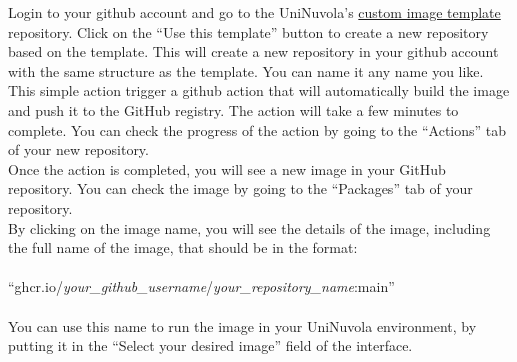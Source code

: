 Login to your github account and go to the UniNuvola's \href{https://github.com/UniNuvola/custom-image-template}{custom image template}
repository. Click on the ``Use this template'' button to create a new
repository based on the template. This will create a new repository in your
github account with the same structure as the template. You can name it
any name you like. \\
This simple action trigger a github action that will automatically build
the image and push it to the GitHub registry. The action will take a few
minutes to complete. You can check the progress of the action by going to the ``Actions'' tab of
your new repository. \\
Once the action is completed, you will see a new image in your GitHub
repository. You can check the image by going to the ``Packages'' tab of your
repository.
\\
By clicking on the image name, you will see the details of the image, including
the full name of the image, that should be in the format: \\
\\
``ghcr.io/\textit{your\_github\_username}/\textit{your\_repository\_name}:main''
\\
\\
You can use this name to run the image in your UniNuvola environment, by
putting it in the ``Select your desired image'' field of the
\jupyterhubn{} interface. \\
